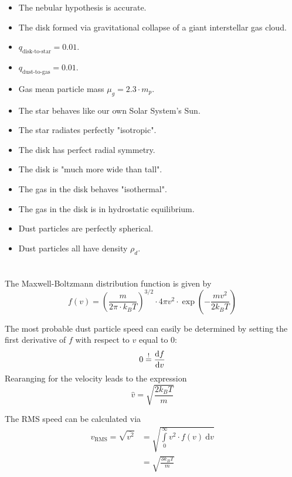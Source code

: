     \begin{itemize}
        \item The nebular hypothesis is accurate. 
        \item The disk formed via gravitational collapse of a giant interstellar gas cloud.
        \item $q_\text{disk-to-star}=0.01$.
        \item $q_\text{dust-to-gas}=0.01$.
        \item Gas mean particle mass $\mu_g=2.3\cdot m_p$.
        \item The star behaves like our own Solar System's Sun.
        \item The star radiates perfectly "isotropic".
        \item The disk has perfect radial symmetry.
        \item The disk is "much more wide than tall".
        \item The gas in the disk behaves "isothermal".
        \item The gas in the disk is in hydrostatic equilibrium.
        \item Dust particles are perfectly spherical.
        \item Dust particles all have density $\rho_d$.
    \end{itemize}

\section{}

    The Maxwell-Boltzmann distribution function is given by 
    \begin{equation}
        f(v)
        =\left(\frac{m}{2\pi\cdot k_BT}\right)^{3/2}
        \cdot4\pi v^2\cdot\exp\left(-\frac{mv^2}{2k_BT}\right)
    \end{equation}

    The most probable dust particle speed can easily be determined by 
    setting the first derivative of $f$ with respect to $v$ equal to 0:
    \begin{equation}
        0\overset{!}{=}\frac{\text{d} f}{\text{d} v}
    \end{equation}
    Rearanging for the velocity leads to the expression
    \begin{equation}
        \hat{v}=\sqrt{\frac{2k_BT}{m}}
    \end{equation}

    The RMS speed can be calculated via
    \begin{align}
        v_\text{RMS}
        =\sqrt{\overline{v^2}}
        &=\sqrt{\int\limits_0^\infty v^2\cdot f(v)\ \text{d}v}\\
        &=\sqrt{\frac{3k_BT}{m}}
    \end{align}

